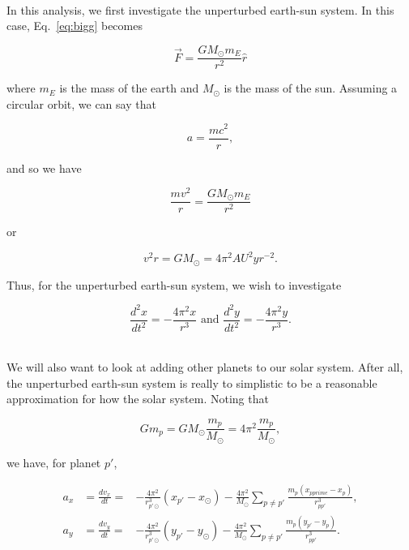 \documentclass[12pt]{article}
\numberwithin{equation}{section}
\begin{document}
\\\indent In this analysis, we first investigate the unperturbed earth-sun system.  In this case, Eq.~\ref{eq:bigg} becomes

\begin{equation}
\label{eq:earthsunbigg}
\vec{F} = \frac{GM_{\odot}m_{E}}{r^{2}}\hat{r}
\end{equation}

\noindent where $m_{E}$ is the mass of the earth and $M_{\odot}$ is the mass of the sun.  Assuming a circular orbit, we can say that 

$$a = \frac{mc^{2}}{r},$$

\noindent and so we have

$$\frac{mv^{2}}{r} = \frac{GM_{\odot}m_{E}}{r^{2}}$$

\noindent or

$$v^{2}r = GM_{\odot} = 4\pi^{2} AU^{2}yr^{-2}.$$

\noindent Thus, for the unperturbed earth-sun system, we wish to investigate

\begin{equation}
\label{eq:earthsun}
\frac{d^{2}x}{dt^{2}} = -\frac{4\pi^{2}x}{r^{3}} \text{ and } \frac{d^{2}y}{dt^{2}} = -\frac{4\pi^{2}y}{r^{3}}.
\end{equation}

\\\indent We will also want to look at adding other planets to our solar system.  After all, the unperturbed earth-sun system is really to simplistic to be a reasonable approximation for how the solar system.  Noting that

$$Gm_{p} = GM_{\odot}\frac{m_{p}}{M_{\odot}}=4\pi^{2}\frac{m_{p}}{M_{\odot}},$$

\noindent we have, for planet $p\prime$,

\begin{equation}
\label{eq:multiplanet}
\begin{align}
a_{x} &=  \frac{dv_{x}}{dt} =&  -\frac{4\pi^{2}}{r_{p\prime\odot}^{3}}\left(x_{p\prime} - x_{\odot}\right) - \frac{4\pi^{2}}{M_{\odot}}\sum_{p\neq p\prime}\frac{m_{p}\left(x_{pprime} - x_{p}\right)}{r_{pp\prime}^{3}}, \\
a_{y} &=  \frac{dv_{y}}{dt} =&  -\frac{4\pi^{2}}{r_{p\prime\odot}^{3}}\left(y_{p\prime} - y_{\odot}\right) - \frac{4\pi^{2}}{M_{\odot}}\sum_{p\neq p\prime}\frac{m_{p}\left(y_{p\prime} - y_{p}\right)}{r_{pp\prime}^{3}}.
\end{align}
\end{equation}
\end{document}
